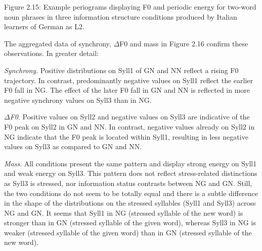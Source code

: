 \begin{stylecaption}
Figure 2.15: Example periograms displaying F0 and periodic energy for two-word noun phrases in three information structure conditions produced by Italian learners of German as L2.
\end{stylecaption}

\begin{styleStandard}
The aggregated data of synchrony, ${\Delta}$F0 and mass in Figure 2.16 confirm these observations. In greater detail:
\end{styleStandard}

\begin{listWWNumiiileveli}
\item 
\begin{stylelsBulletList}
\textit{Synchrony}. Positive distributions on Syll1 of GN and NN reflect a rising F0 trajectory. In contrast, predominantly negative values on Syll1 reflect the earlier F0 fall in NG. The effect of the later F0 fall in GN and NN is reflected in more negative synchrony values on Syll3 than in NG.
\end{stylelsBulletList}
\item 
\begin{stylelsBulletList}
\textit{${\Delta}$F0}. Positive values on Syll2 and negative values on Syll3 are indicative of the F0 peak on Syll2 in GN and NN. In contrast, negative values already on Syll2 in NG indicate that the F0 peak is located within Syll1, resulting in less negative values on Syll3 as compared to GN and NN.
\end{stylelsBulletList}
\item 
\begin{stylelsBulletList}
\textit{Mass}. All conditions present the same pattern and display strong energy on Syll1 and weak energy on Syll3. This pattern does not reflect stress-related distinctions as Syll3 is stressed, nor information status contrasts between NG and GN. Still, the two conditions do not seem to be totally equal and there is a subtle difference in the shape of the distributions on the stressed syllables (Syll1 and Syll3) across NG and GN. It seems that Syll1 in NG (stressed syllable of the new word) is stronger than in GN (stressed syllable of the given word), whereas Syll3 in NG is weaker (stressed syllable of the given word) than in GN (stressed syllable of the new word).
\end{stylelsBulletList}
\end{listWWNumiiileveli}
\begin{stylecaption}
  [Warning: Image ignored] %
 
\end{stylecaption}

